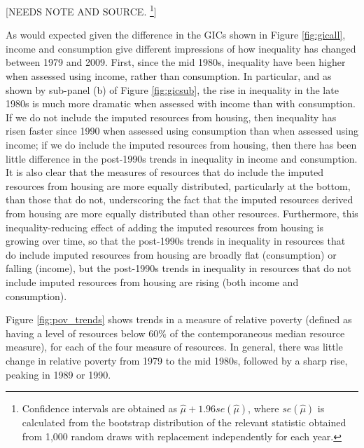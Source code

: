 [NEEDS NOTE AND SOURCE. \footnote{Confidence intervals are obtained as $\hat{\mu} + 1.96se(\hat{\mu})$, where $se(\hat{\mu})$ is calculated from the bootstrap distribution of the relevant statistic obtained from 1,000 random draws with replacement independently for each year.}]

As would expected given the difference in the GICs shown in Figure \ref{fig:gicall}, income and consumption give different impressions of how inequality has changed between 1979 and 2009.  First, since the mid 1980s, inequality have been higher when assessed using income, rather than consumption. In particular, and as shown by sub-panel (b) of Figure \ref{fig:gicsub}, the rise in inequality in the late 1980s is much more dramatic when assessed with income than with consumption. If we do not include the imputed resources from housing, then inequality has risen faster since 1990 when assessed using consumption than when assessed using income; if we do include the imputed resources from housing, then there has been little difference in the post-1990s trends in inequality in income and consumption. It is also clear that the measures of resources that do include the imputed resources from housing are more equally distributed, particularly at the bottom, than those that do not, underscoring the fact that the imputed resources derived from housing are more equally distributed than other resources. Furthermore, this inequality-reducing effect of adding the imputed resources from housing is growing over time, so that the post-1990s trends in inequality in resources that do include imputed resources from housing are broadly flat (consumption) or falling (income), but the post-1990s trends in inequality in resources that do not include imputed resources from housing are rising (both income and consumption).



Figure \ref{fig:pov_trends} shows trends in a measure of relative poverty (defined as having a level of resources below 60\% of the contemporaneous median resource measure), for each of the four measure of resources. In general, there was little change in relative poverty from 1979 to the mid 1980s, followed by a sharp rise, peaking in 1989 or 1990. 

